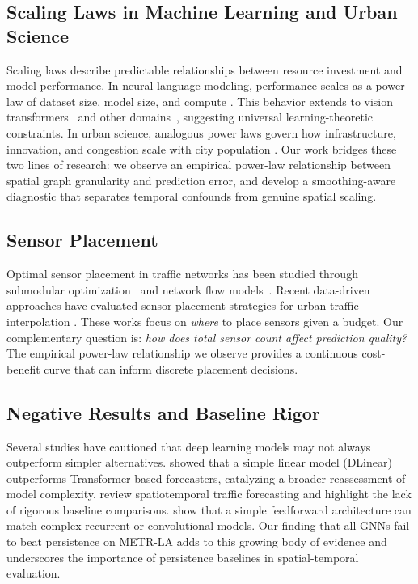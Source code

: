 \documentclass[letterpaper]{article}
\begin{document}
\subsection{Scaling Laws in Machine Learning and Urban Science}

Scaling laws describe predictable relationships between resource investment and model performance. In neural language modeling, performance scales as a power law of dataset size, model size, and compute \cite{kaplan2020scaling,hoffmann2022chinchilla}. This behavior extends to vision transformers~\cite{zhai2022scaling} and other domains~\cite{hestness2017deep}, suggesting universal learning-theoretic constraints. In urban science, analogous power laws govern how infrastructure, innovation, and congestion scale with city population \cite{bettencourt2007growth,bettencourt2013origins,louf2014congestion}. Our work bridges these two lines of research: we observe an empirical power-law relationship between spatial graph granularity and prediction error, and develop a smoothing-aware diagnostic that separates temporal confounds from genuine spatial scaling.

\subsection{Sensor Placement}

Optimal sensor placement in traffic networks has been studied through submodular optimization~\cite{krause2008robust,krause2005nonmyopic} and network flow models~\cite{gentili2008locating}. Recent data-driven approaches have evaluated sensor placement strategies for urban traffic interpolation \cite{kaiser2026sensor}. These works focus on \textit{where} to place sensors given a budget. Our complementary question is: \textit{how does total sensor count affect prediction quality?} The empirical power-law relationship we observe provides a continuous cost-benefit curve that can inform discrete placement decisions.

\subsection{Negative Results and Baseline Rigor}

Several studies have cautioned that deep learning models may not always outperform simpler alternatives. \citet{zeng2023transformers} showed that a simple linear model (DLinear) outperforms Transformer-based forecasters, catalyzing a broader reassessment of model complexity. \citet{ermagun2018spatiotemporal} review spatiotemporal traffic forecasting and highlight the lack of rigorous baseline comparisons. \citet{oreshkin2020nbeats} show that a simple feedforward architecture can match complex recurrent or convolutional models. Our finding that all GNNs fail to beat persistence on METR-LA adds to this growing body of evidence and underscores the importance of persistence baselines in spatial-temporal evaluation.
\end{document}

